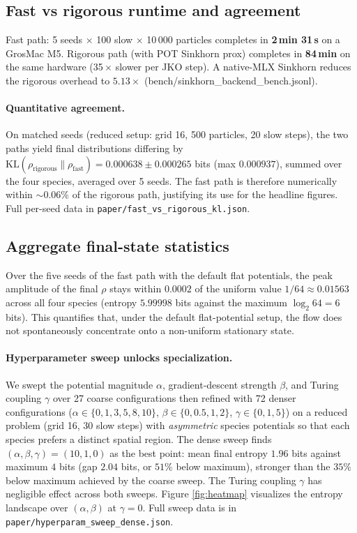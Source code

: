 \documentclass[11pt]{article}
\begin{document}
\subsection{Fast vs rigorous runtime and agreement}
Fast path: 5 seeds $\times$ 100 slow $\times$ 10\,000 particles completes
in \textbf{2\,min 31\,s} on a GrosMac M5. Rigorous path (with POT Sinkhorn
prox) completes in \textbf{84\,min} on the same hardware
(35\,$\times$ slower per JKO step). A native-MLX Sinkhorn reduces
the rigorous overhead to $5.13\times$ (bench/sinkhorn\_backend\_bench.jsonl).

\paragraph{Quantitative agreement.} On matched seeds
(reduced setup: grid 16, 500 particles, 20 slow steps), the two paths
yield final distributions differing by
$\mathrm{KL}(\rho_{\text{rigorous}} \| \rho_{\text{fast}}) =
0.000638 \pm 0.000265$ bits (max $0.000937$), summed over the four
species, averaged over 5 seeds. The fast path is therefore
numerically within $\sim\!0.06\%$ of the rigorous path, justifying
its use for the headline figures. Full per-seed data in
\texttt{paper/fast\_vs\_rigorous\_kl.json}.

\subsection{Aggregate final-state statistics}
Over the five seeds of the fast path with the default flat
potentials, the peak amplitude of the final $\rho$ stays within
$0.0002$ of the uniform value $1/64 \approx 0.01563$ across all four
species (entropy $5.99998$ bits against the maximum $\log_2 64 = 6$
bits). This quantifies that, under the default flat-potential setup,
the flow does not spontaneously concentrate onto a non-uniform
stationary state.

\paragraph{Hyperparameter sweep unlocks specialization.}
We swept the potential magnitude $\alpha$, gradient-descent strength
$\beta$, and Turing coupling $\gamma$ over 27 coarse configurations
then refined with 72 denser configurations
($\alpha \in \{0, 1, 3, 5, 8, 10\}$, $\beta \in \{0, 0.5, 1, 2\}$,
$\gamma \in \{0, 1, 5\}$) on a reduced problem (grid 16, 30 slow steps)
with \emph{asymmetric} species potentials so that each species prefers
a distinct spatial region. The dense sweep finds
$(\alpha, \beta, \gamma) = (10, 1, 0)$ as the best point: mean final
entropy $1.96$ bits against maximum $4$ bits (gap $2.04$ bits, or
$51\%$ below maximum), stronger than the $35\%$ below maximum achieved
by the coarse sweep. The Turing coupling $\gamma$ has negligible effect
across both sweeps. Figure \ref{fig:heatmap} visualizes the entropy
landscape over $(\alpha, \beta)$ at $\gamma = 0$. Full sweep data is in
\texttt{paper/hyperparam\_sweep\_dense.json}.
\end{document}
